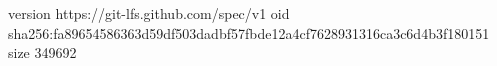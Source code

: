 version https://git-lfs.github.com/spec/v1
oid sha256:fa89654586363d59df503dadbf57fbde12a4cf7628931316ca3c6d4b3f180151
size 349692
